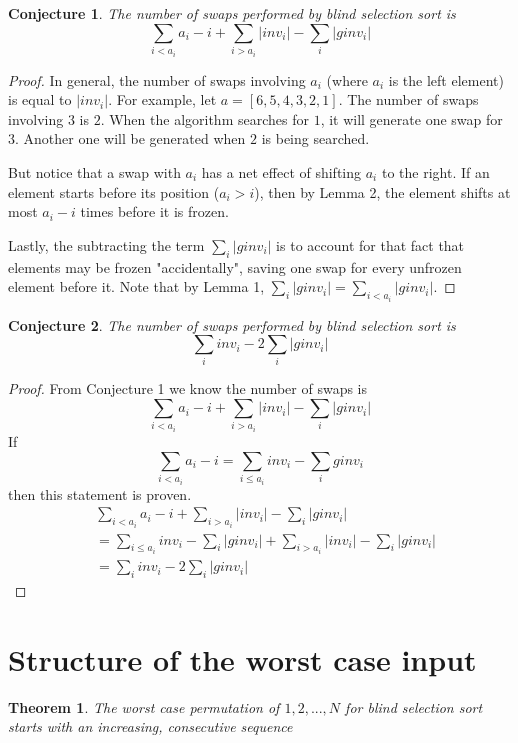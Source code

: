 \documentclass{article}
\newtheorem{conjecture}{Conjecture}
\newtheorem{theorem}{Theorem}
\begin{document}
\begin{conjecture}
    The number of swaps performed by blind selection sort is
    \begin{equation}
        \sum_{i < a_i} a_i - i + \sum_{i > a_i} \vert inv_i \vert - \sum_{i} \vert ginv_i \vert
    \end{equation}
\end{conjecture}
\begin{proof}
    In general, the number of swaps involving $a_i$ (where $a_i$ is the left element) is equal to $ \vert inv_i \vert $.
For example, let $a = [6, 5, 4, 3, 2, 1]$. The number of swaps involving $3$ is $2$.
When the algorithm searches for $1$, it will generate one swap for $3$. Another one will be generated
when $2$ is being searched.

    But notice that a swap with $a_i$ has a net effect
of shifting $a_i$ to the right. If an element starts before its position ($a_i > i$), then by Lemma 2, the element shifts
at most $a_i - i$ times before it is frozen.

    Lastly, the subtracting the term $ \sum_{i} \vert ginv_i \vert$ is to account
    for that fact that elements may be frozen
    "accidentally", saving one swap for every unfrozen element before it. Note that by Lemma 1,
    $ \sum_{i} \vert ginv_i \vert = \sum_{i < a_i} \vert ginv_i \vert $.
\end{proof}

\begin{conjecture}
    The number of swaps performed by blind selection sort is
    \begin{equation}
        \sum_{i} inv_i - 2 \sum_{i} \vert ginv_i \vert
    \end{equation}
\end{conjecture}
\begin{proof}
    From Conjecture  1 we know the number of swaps is
    \begin{equation}
        \sum_{i < a_i} a_i - i + \sum_{i > a_i} \vert inv_i \vert - \sum_{i} \vert ginv_i \vert
    \end{equation}
    If
    \begin{equation}
        \sum_{i < a_i} a_i - i = \sum_{i \leq a_i} inv_i - \sum_{i} ginv_i
    \end{equation}
    then this statement is proven.
    \begin{align}
        & \sum_{i < a_i} a_i - i + \sum_{i > a_i} \vert inv_i \vert - \sum_{i} \vert ginv_i \vert \\\nonumber
        &= \sum_{i \leq a_i} inv_i - \sum_{i} \vert ginv_i \vert + \sum_{i > a_i} \vert inv_i \vert - \sum_{i} \vert ginv_i \vert \\\nonumber
        &= \sum_{i} inv_i - 2 \sum_{i} \vert ginv_i \vert
    \end{align}
\end{proof}

\section{Structure of the worst case input}
\begin{theorem}
    The worst case permutation of $1, 2, ..., N$ for blind selection sort starts with an increasing, consecutive sequence 
\end{theorem}
\end{document}
